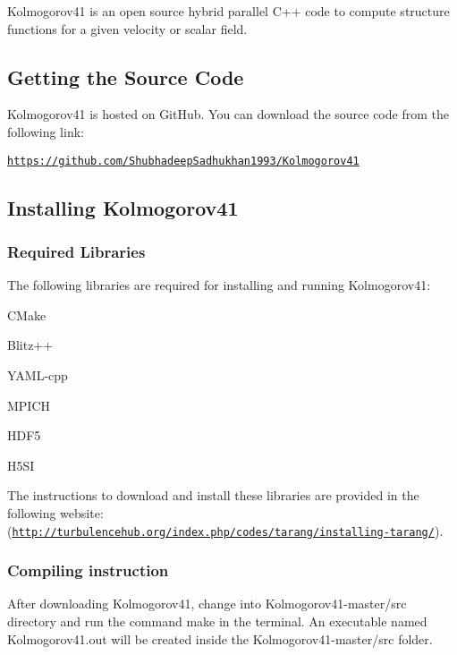 {\ttfamily Kolmogorov41} is an open source hybrid parallel C++ code to compute structure functions for a given velocity or scalar field.

\subsection*{Getting the Source Code}

{\ttfamily Kolmogorov41} is hosted on Git\-Hub. You can download the source code from the following link\-:

\href{https://github.com/ShubhadeepSadhukhan1993/Kolmogorov41}{\tt https\-://github.\-com/\-Shubhadeep\-Sadhukhan1993/\-Kolmogorov41}

\subsection*{Installing {\ttfamily Kolmogorov41}}

\subsubsection*{Required Libraries}

The following libraries are required for installing and running Kolmogorov41\-:


\begin{DoxyEnumerate}
\item {\ttfamily C\-Make}
\item {\ttfamily Blitz++}
\item {\ttfamily Y\-A\-M\-L-\/cpp}
\item {\ttfamily M\-P\-I\-C\-H}
\item {\ttfamily H\-D\-F5}
\item {\ttfamily H5\-S\-I}
\end{DoxyEnumerate}

The instructions to download and install these libraries are provided in the following website\-:(\href{http://turbulencehub.org/index.php/codes/tarang/installing-tarang/}{\tt http\-://turbulencehub.\-org/index.\-php/codes/tarang/installing-\/tarang/}).

\subsubsection*{Compiling instruction}

After downloading {\ttfamily Kolmogorov41}, change into {\ttfamily Kolmogorov41-\/master/src} directory and run the command {\ttfamily make} in the terminal. An executable named {\ttfamily Kolmogorov41.\-out} will be created inside the {\ttfamily Kolmogorov41-\/master/src} folder.

